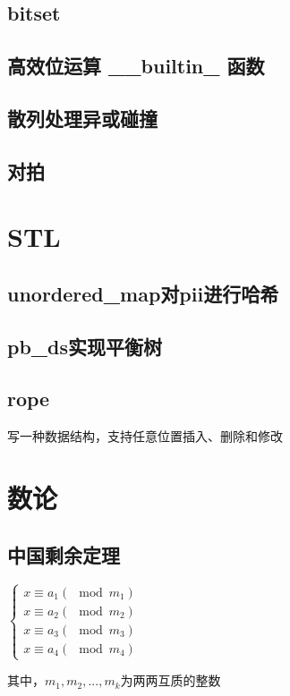 \documentclass[landscape,twoside,a4paper]{article}
\begin{document}
\subsection{bitset}


\subsection{高效位运算 \_\_builtin\_ 函数}


\subsection{散列处理异或碰撞}


\subsection{对拍}



\section{STL}

\subsection{unordered\_map对pii进行哈希}


\subsection{pb\_ds实现平衡树}


\subsection{rope}
写一种数据结构，支持任意位置插入、删除和修改



\section{数论}

\subsection{中国剩余定理}
$\left\{\begin{matrix} x \equiv a_{1} (\mod m_{1})\\ x \equiv a_{2} (\mod m_{2})\\  x \equiv a_{3} (\mod m_{3})\\  x \equiv a_{4} (\mod m_{4})\end{matrix}\right.$ \par
其中，$m_1,m_2,...,m_k$为两两互质的整数

\end{document}
